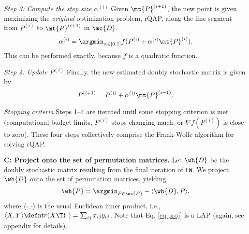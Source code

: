 \documentclass[10pt,journal,cspaper,compsoc]{IEEEtran}
\newcommand{\PmcP}{P \in \mc{P}}
\begin{document}

\emph{Step 3: Compute the step size $\alpha^{(i)}$} Given $\mt{P}^{(i+1)}$, the new point is given maximizing the \emph{original} optimization problem, rQAP, along the line segment from $P^{(i)}$ to $\mt{P}^{(i+1)}$ in $\mc{D}$.    
% 
% 
% 
\begin{align}\label{eq:step}
	\alpha^{(i)} = \argmin_{\alpha \in [0,1]} f(P^{(i)} + \alpha^{(i)} \mt{P}^{(i)}).
\end{align}
This can be performed exactly, because $f$ is a quadratic function.  


\emph{Step 4: Update $P^{(i)}$} Finally, the new estimated doubly stochastic matrix is given by
\begin{align}\label{eq:update}
	P^{(i+1)} = P^{(i)} + \alpha^{(i)} \mt{P}^{(i+1)}.
\end{align}


\emph{Stopping criteria} Steps 1--4 are iterated until some stopping criterion is met (computational budget limits, $P^{(i)}$ stops changing much, or $\nabla f(P^{(i)})$ is close to zero).  These four steps collectively comprise the Frank-Wolfe algorithm for solving rQAP.  %


\textbf{C: Project onto the set of permutation matrices.}   Let $\wh{D}$ be the doubly stochastic matrix resulting from the final iteration of \texttt{FW}.  We project $\wh{D}$ onto the set of permutation matrices, yielding
\begin{align} \label{eq:proj}
	\wh{P} = \argmin_{\PmcP} -\langle \wh{D}, P \rangle,
\end{align}
where $\langle \cdot,\cdot \rangle$ %
is the usual Euclidean inner product, i.e., $\langle X,Y\rangle \defn tr(X\T Y)= \sum_{ij} x_{ij} y_{ij}$.  Note that Eq. \eqref{eq:proj} is a LAP (again, see appendix for details).
\end{document}
